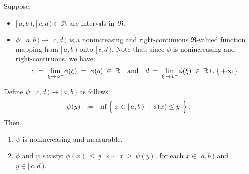 
\begin{lemma}\label{lemma:nonincreasingRightContinuous}
\mbox{}\vskip 0.1cm
\noindent
Suppose:
\begin{itemize}
\item
	$[\,a,b\,), [\,c,d\,) \subset \Re$ are intervals in \,$\Re$.
\item
	$\phi : [\,a,b\,) \longrightarrow [\,c,d\,)$ is a nonincreasing and right-continuous
	$\Re$-valued function mapping from $[\,a,b\,)$ {\color{red}onto} $[\,c,d\,)$.
	Note that, since $\phi$ is nonincreasing and right-continuous, we have:
	\begin{equation*}
	c \; = \; \underset{\xi\,\rightarrow\,a^{+}}{\lim}\phi(\xi) \; = \; \phi(a) \; \in \; \Re
	\quad\textnormal{and}\quad
	d \; = \; \underset{\xi\,\rightarrow\,b^{-}}{\lim}\phi(\xi) \; \in \; \Re\cup\{\,+\infty\,\}
	\end{equation*}
\end{itemize}
Define \;$\psi : [\,c,d\,) \longrightarrow [\,a,b\,)$\; as follows:
\begin{equation*}
\psi(y)
\;\; := \;\;
	\inf\left\{\;
		x \in [\,a,b\,)
	\,\;\left\vert\;\,
		\overset{{\color{white}.}}{\phi}(x) \leq y
	\right.
	\;\right\}.
\end{equation*}
Then,
\begin{enumerate}
\item
	$\psi$ is nonincreasing and measurable.
\item
	$\phi$ and $\psi$ satisfy:\quad
	$\phi(x) \,\leq\, y \;\; \Longleftrightarrow \;\; x \,\geq\, \psi(y)$,\;\;
	for each \;$x \in [\,a,b\,)$\; and \;$y \in [\,c,d\,)$.
\end{enumerate}
\end{lemma}
\proof
